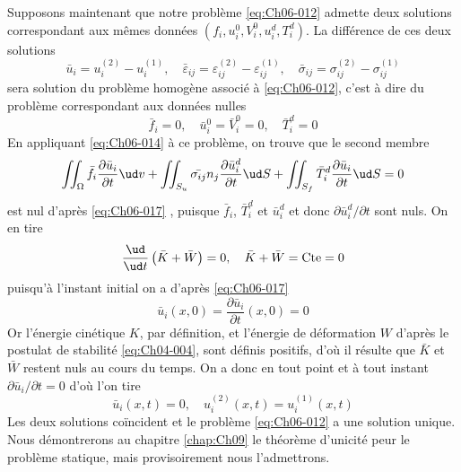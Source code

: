 Supposons maintenant que notre problème \eqref{eq:Ch06-012} admette deux solutions correspondant aux mêmes données $\left( f_i, u_i^0, V_i^0, u_i^d, T_i^d \right)$.
La différence de ces deux solutions
\begin{equation}
    \bar{u}_i = u_i^{(2)} - u_i^{(1)}, \quad \bar{\varepsilon}_{ij} = \varepsilon_{ij}^{(2)} - \varepsilon_{ij}^{(1)}, \quad  \bar{\sigma}_{ij} = \sigma_{ij}^{(2)} - \sigma_{ij}^{(1)}
    \label{eq:Ch06-016}
\end{equation}
sera solution du problème homogène associé à \eqref{eq:Ch06-012}, c'est à dire du problème correspondant aux données nulles
\begin{equation}
    \bar{f}_i = 0, \quad \bar{u}_i^0 = \bar{V}_i^0 = 0, \quad \bar{T}_i^d= 0
    \label{eq:Ch06-017}
\end{equation}
En appliquant \eqref{eq:Ch06-014} à ce problème, on trouve que le second membre
\begin{equation}
    \iint_{\Omega} \bar{f}_i \frac{\partial \bar{u}_i}{\partial t} \ud v + \iint_{S_u} \bar{\sigma_{ij}} n_j \frac{\partial \bar{u}_i^d}{\partial t} \ud S + \iint_{S_f} \bar{T}_i^d \frac{\partial \bar{u}_i}{\partial t} \ud S = 0
    \label{eq:Ch06-018}
\end{equation}
est nul d'après \eqref{eq:Ch06-017} , puisque $\bar{f}_i$, $\bar{T}_i^d$ et $\bar{u}_i^d$ et donc $\partial \bar{u}_i^d/\partial t$ sont nuls.
On en tire
\begin{equation}
    \frac{\ud}{\ud t} \left( \bar{K} + \bar{W} \right) = 0, \quad \bar{K} + \bar{W} = \text{Cte} = 0
    \label{eq:Ch06-019}
\end{equation}
puisqu'à l'instant initial on a d'après \eqref{eq:Ch06-017}
\begin{equation}
    \bar{u}_i \left( x,0 \right) = \frac{\partial \bar{u}_i}{\partial t} \left( x,0 \right) = 0
    \label{eq:Ch06-020}
\end{equation}
Or l'énergie cinétique $K$, par définition, et l'énergie de déformation $W$ d'après le postulat de stabilité \eqref{eq:Ch04-004}, sont définis positifs, d'où il résulte que $\bar{K}$ et $\bar{W}$ restent nuls au cours du temps.
On a donc en tout point et à tout instant $\partial \bar{u}_i/\partial t = 0$ d'où l'on tire
\begin{equation}
    \bar{u}_i \left( x,t \right) = 0, \quad u_i^{(2)} \left( x,t \right) = u_i^{(1)} \left( x,t \right)
    \label{eq:Ch06-021}
\end{equation}
Les deux solutions coïncident et le problème \eqref{eq:Ch06-012} a une solution unique.
Nous démontrerons au chapitre \ref{chap:Ch09} le théorème d'unicité peur le problème statique, mais provisoirement nous l'admettrons.

